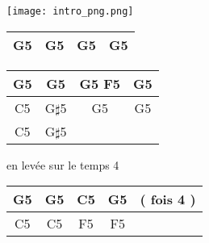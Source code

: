 \beforegrille

\texttt{[image: intro\_png.png]}

\begin{tabular}{|c|c|c|c|}
    \hline
    G5 & G5 & G5 & G5 \\
    \hline
\end{tabular}

\begin{tabular}{|c|c|c|c|}
    \hline
    G5 & G5         & G5 F5 & G5 \\
    \hline
    C5 & G$\sharp$5 & G5    & G5 \\
    \hline
    C5 & G$\sharp$5 &       &    \\
    \hline
\end{tabular}


en levée sur le temps 4

\begin{tabular}{|c|c|c|c|c|}
    \hline
    G5 & G5 & C5 & G5 & ( fois 4 ) \\
    \hline
    C5 & C5 & F5 & F5 &            \\
    \hline
\end{tabular}

